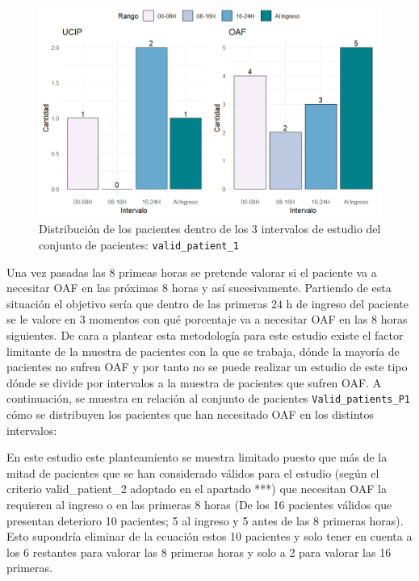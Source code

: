 \begin{figure}[H]
    \centering
    \includegraphics[scale = 0.9]{./img/intervalos-valid-1.png}
    \caption{Distribución de los pacientes dentro de los $3$ intervalos de estudio del conjunto de pacientes: \texttt{valid\_patient\_1}}
    \label{fig:intervalos-valid-1}
\end{figure}








Una vez pasadas las $8$ primeas horas se pretende valorar si el paciente va a necesitar OAF en las próximas $8$ horas y así sucesivamente. Partiendo de esta situación el objetivo sería que dentro de las primeras $24$ h de ingreso del paciente se le valore en $3$ momentos con qué porcentaje va a necesitar OAF en las $8$ horas siguientes. De cara a plantear esta metodología para este estudio existe el factor limitante de la muestra de pacientes con la que se trabaja, dónde la mayoría de pacientes no sufren OAF y por tanto no se puede realizar un estudio de este tipo dónde se divide por intervalos a la muestra de pacientes que sufren OAF. A continuación, se muestra en relación al conjunto de pacientes \texttt{Valid\_patients\_P1} cómo se distribuyen los pacientes que han necesitado OAF en los distintos intervalos:

En este estudio este planteamiento se muestra limitado puesto que más de la mitad de pacientes que se han considerado válidos para el estudio (según el criterio valid\_patient\_2 adoptado en el apartado ***) que necesitan OAF la requieren al ingreso o en las primeras 8 horas (De los 16 pacientes válidos que presentan deterioro 10 pacientes; 5 al ingreso y 5 antes de las 8 primeras horas). Esto supondría eliminar de la ecuación estos 10 pacientes y solo tener en cuenta a los 6 restantes para valorar las 8 primeras horas y solo a 2 para valorar las 16 primeras.



